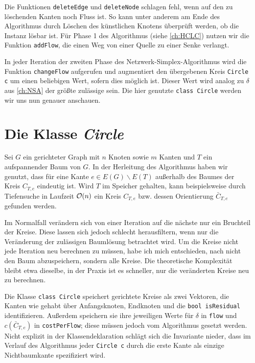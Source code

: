 Die Funktionen \lstinline|deleteEdge| und \lstinline|deleteNode| schlagen fehl, wenn auf den zu löschenden Kanten noch Fluss ist. So kann unter anderem am Ende des Algorithmus durch Löschen des künstlichen Knotens überprüft werden, ob die Instanz lösbar ist. Für Phase 1 des Algorithmus (siehe \cref{ch:HCLC}) nutzen wir die Funktion \lstinline|addFlow|, die einen Weg von einer Quelle zu einer Senke verlangt.

In jeder Iteration der zweiten Phase des Netzwerk-Simplex-Algorithmus wird die Funktion \lstinline|changeFlow| aufgerufen und augmentiert den übergebenen Kreis \lstinline|Circle c| um einen beliebigen Wert, sofern dies möglich ist. Dieser Wert wird analog zu $\delta$ aus \cref{ch:NSA} der größte zulässige sein. Die hier genutzte \lstinline|class Circle| werden wir uns nun genauer anschauen.

\section{Die Klasse \emph{Circle}}\label{ch:circle}
Sei $G$ ein gerichteter Graph mit $n$ Knoten sowie $m$ Kanten und $T$ ein aufspannender Baum von $G$. In der Herleitung des Algorithmus haben wir genutzt, dass für eine Kante $e\in E(G)\backslash E(T)$ außerhalb des Baumes der Kreis $C_{T,e}$ eindeutig ist. Wird $T$ im Speicher gehalten, kann beispielsweise durch Tiefensuche in Laufzeit $\mathcal{O}(n)$ ein Kreis $C_{T,e}$ bzw. dessen Orientierung $\bar{C}_{T,e}$ gefunden werden.

Im Normalfall verändern sich von einer Iteration auf die nächste nur ein Bruchteil der Kreise. Diese lassen sich jedoch schlecht herausfiltern, wenn nur die Veränderung der zulässigen Baumlösung betrachtet wird. Um die Kreise nicht jede Iteration neu berechnen zu müssen, habe ich mich entschieden, nach \cite{betreuer} nicht den Baum abzuspeichern, sondern alle Kreise. Die theoretische Komplexität bleibt etwa dieselbe,\footnotemark{} in der Praxis ist es schneller, nur die veränderten Kreise neu zu berechnen.


Die Klasse \lstinline|class Circle| speichert gerichtete Kreise als zwei Vektoren, die Kanten wie gehabt über Anfangsknoten, Endknoten und die \lstinline|bool isResidual| identifizieren. Außerdem speichern sie ihre jeweiligen Werte für $\delta$ in \lstinline|flow| und $c(\bar{C}_{T,e})$ in \lstinline|costPerFlow|; diese müssen jedoch vom Algorithmus gesetzt werden. Nicht explizit in der Klassendeklaration schlägt sich die Invariante nieder, dass im Verlauf des Algorithmus jeder \lstinline|Circle c| durch die erste Kante als einzige Nichtbaumkante spezifiziert wird.

